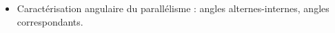 \begin{prerequis}    
    \begin{itemize}
        \item[\emoji{red-heart}] Caractérisation angulaire du parallélisme : angles alternes-internes, angles correspondants.
    \end{itemize}
\end{prerequis}

